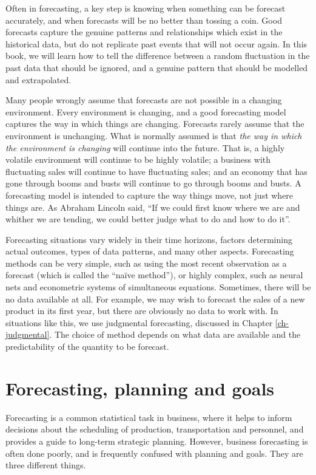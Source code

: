\documentclass[]{book}
\begin{document}
Often in forecasting, a key step is knowing when something can be forecast accurately, and when forecasts will be no better than tossing a coin. Good forecasts capture the genuine patterns and relationships which exist in the historical data, but do not replicate past events that will not occur again. In this book, we will learn how to tell the difference between a random fluctuation in the past data that should be ignored, and a genuine pattern that should be modelled and extrapolated.

Many people wrongly assume that forecasts are not possible in a changing environment. Every environment is changing, and a good forecasting model captures the way in which things are changing. Forecasts rarely assume that the environment is unchanging. What is normally assumed is that \emph{the way in which the environment is changing} will continue into the future. That is, a highly volatile environment will continue to be highly volatile; a business with fluctuating sales will continue to have fluctuating sales; and an economy that has gone through booms and busts will continue to go through booms and busts. A forecasting model is intended to capture the way things move, not just where things are. As Abraham Lincoln said, ``If we could first know where we are and whither we are tending, we could better judge what to do and how to do it''.

Forecasting situations vary widely in their time horizons, factors determining actual outcomes, types of data patterns, and many other aspects. Forecasting methods can be very simple, such as using the most recent observation as a forecast (which is called the ``naïve method''), or highly complex, such as neural nets and econometric systems of simultaneous equations. Sometimes, there will be no data available at all. For example, we may wish to forecast the sales of a new product in its first year, but there are obviously no data to work with. In situations like this, we use judgmental forecasting, discussed in Chapter \ref{ch-judgmental}. The choice of method depends on what data are available and the predictability of the quantity to be forecast.

\hypertarget{sec-1-2-ForPlanGoals}{%
\section{Forecasting, planning and goals}\label{sec-1-2-ForPlanGoals}}

Forecasting is a common statistical task in business, where it helps to inform decisions about the scheduling of production, transportation and personnel, and provides a guide to long-term strategic planning. However, business forecasting is often done poorly, and is frequently confused with planning and goals. They are three different things.
\end{document}
